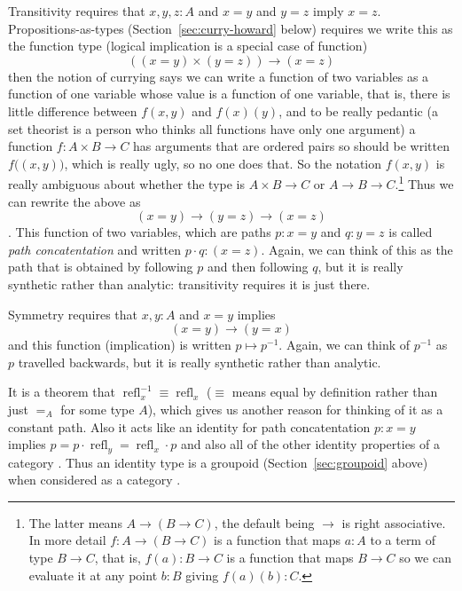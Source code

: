 \documentclass[11pt]{article}
\DeclareMathOperator{\refl}{refl}
\begin{document}
Transitivity requires that $x, y, z : A$ and $x = y$ and $y = z$
imply $x = z$.  Propositions-as-types (Section~\ref{sec:curry-howard} below)
requires we write this as the function type (logical implication is a special
case of function)
$$
   ((x = y) \times (y = z)) \to (x = z)
$$
then the notion of currying says we can write a function of two variables
as a function of one variable whose value is a function of one variable,
that is, there is little difference between $f(x, y)$ and $f(x)(y)$, and
to be really pedantic (a set theorist is a person who thinks all functions
have only one argument) a function $f : A \times B \to C$ has arguments
that are ordered pairs so should be written $f\bigl((x, y)\bigr)$, which is
really ugly, so no one does that.  So the notation $f(x, y)$ is really
ambiguous about whether the type
is $A \times B \to C$ or $A \to B \to C$.\footnote{The latter means
$A \to (B \to C)$, the default being $\to$ is right associative.  In more
detail $f : A \to (B \to C)$ is a function that maps $a : A$ to a term of
type $B \to C$, that is, $f(a) : B \to C$ is a function that maps $B \to C$
so we can evaluate it at any point $b : B$ giving $f(a)(b) : C$.}
Thus we can rewrite the above as
$$
   (x = y) \to (y = z) \to (x = z)
$$
.  This function of two variables, which are
paths $p : x = y$ and $q : y = z$ is called \emph{path concatentation}
and written $p \cdot q : (x = z)$.
Again, we can think of this as the path that is obtained by following $p$
and then following $q$, but it is really synthetic rather than analytic:
transitivity requires it is just there.

Symmetry requires that $x, y : A$ and $x = y$ implies
$$
   (x = y) \to (y = x)
$$
and this function (implication) is written $p \mapsto p^{-1}$.
Again, we can think of $p^{-1}$ as $p$ travelled backwards,
but it is really synthetic rather than analytic.

It is a theorem that $\refl_x^{-1} \equiv \refl_x$
 ($\equiv$ means equal by definition
rather than just $=_A$ for some type $A$), which gives us another reason
for thinking of it as a constant path.  Also it acts like an identity
for path concatentation $p : x = y$ implies
$p = p \cdot \refl_y = \refl_x \cdot p$ and also all of the other identity
properties of a category
.
Thus an identity type is a groupoid (Section~\ref{sec:groupoid} above)
when considered as a category
.
\end{document}
